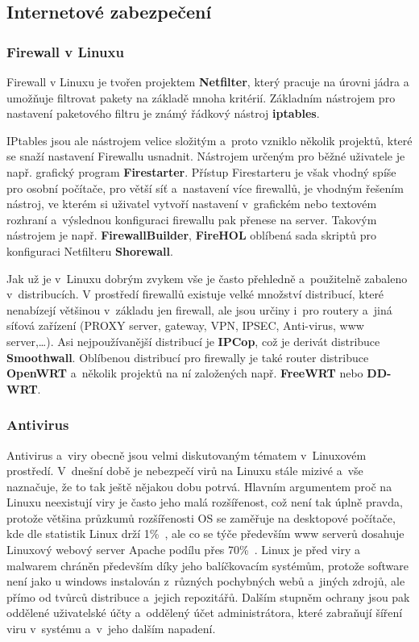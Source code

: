 \documentclass[a4paper,12pt]{article}
\renewcommand{\b}[1]{\textbf{#1}} %
\begin{document}
\subsection{Internetové zabezpečení}

\subsubsection{Firewall v Linuxu}

Firewall v Linuxu je tvořen projektem \b{Netfilter}, který pracuje na úrovni jádra a umožňuje filtrovat pakety na základě mnoha kritérií. Základním nástrojem pro nastavení paketového filtru je známý řádkový nástroj \b{iptables}.~\cite{FirewallNetfilter}

IPtables jsou ale nástrojem velice složitým a~proto vzniklo několik projektů, které se snaží nastavení Firewallu usnadnit. Nástrojem určeným pro běžné uživatele je např. grafický program \b{Firestarter}. Přístup Firestarteru je však vhodný spíše pro osobní počítače, pro větší síť a~nastavení více firewallů, je vhodným řešením nástroj, ve kterém si uživatel vytvoří nastavení v~grafickém nebo textovém rozhraní a~výslednou konfiguraci firewallu pak přenese na server. Takovým nástrojem je např. \b{FirewallBuilder}, \b{FireHOL} oblíbená sada skriptů pro konfiguraci Netfilteru \b{Shorewall}.

Jak už je v~Linuxu dobrým zvykem vše je často přehledně a~použitelně zabaleno v~distribucích. V prostředí firewallů existuje velké množství distribucí, které nenabízejí většinou v~základu jen firewall, ale jsou určiny i~pro routery a~jiná síťová zařízení (PROXY server, gateway, VPN, IPSEC, Anti-virus, www server,…). Asi nejpoužívanější distribucí je \b{IPCop}, což je derivát distribuce \b{Smoothwall}. Oblíbenou distribucí pro firewally je také router distribuce \b{OpenWRT} a~několik projektů na ní založených např. \b{FreeWRT} nebo \b{DD-WRT}.

\subsubsection{Antivirus}\label{sec:antivirus}

Antivirus a~viry obecně jsou velmi diskutovaným tématem v~Linuxovém prostředí. V~dnešní době je nebezpečí virů na Linuxu stále mizivé a~vše naznačuje, že to tak ještě nějakou dobu potrvá. Hlavním argumentem proč na Linuxu neexistují viry je často jeho malá rozšířenost, což není tak úplně pravda, protože většina průzkumů rozšířenosti OS se zaměřuje na desktopové počítače, kde dle statistik Linux drží 1\%~\cite{StatistikaOS}, ale co se týče především www serverů dosahuje Linuxový webový server Apache podílu přes 70\%~\cite{StatLinuxWebServer}. Linux je před viry a malwarem chráněn především díky jeho balíčkovacím systémům, protože software není jako u windows instalován z~různých pochybných webů a~jiných zdrojů, ale přímo od tvůrců distribuce a~jejich repozitářů. Dalším stupněm ochrany jsou pak oddělené uživatelské účty a~oddělený účet administrátora, které zabraňují šíření viru v~systému a~v~jeho dalším napadení.~\cite{LinuxCZviry}\\
\end{document}
